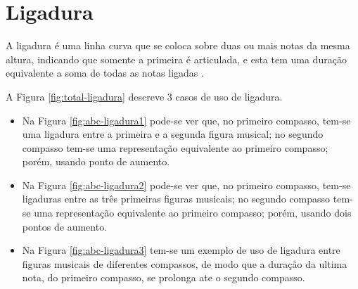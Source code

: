 
\section{Ligadura}
\label{sec:ligadura}

A ligadura é uma linha curva que se coloca sobre duas ou mais notas da mesma altura, 
indicando que somente a primeira é articulada, 
e esta tem uma duração equivalente a soma de todas as notas ligadas \cite[pp. 35]{cardoso1973curso}.

\begin{example}
A Figura \ref{fig:total-ligadura} descreve 3 casos de uso de ligadura.
\begin{itemize}
\item Na Figura \ref{fig:abc-ligadura1} pode-se ver que, no primeiro compasso, 
tem-se uma ligadura entre a primeira e a segunda figura musical; 
no segundo compasso tem-se uma representação equivalente ao primeiro compasso; 
porém, usando ponto de aumento.
\item Na Figura \ref{fig:abc-ligadura2} pode-se ver que, no primeiro compasso, 
tem-se ligaduras entre as três primeiras figuras musicais; 
no segundo compasso tem-se uma representação equivalente ao primeiro compasso; 
porém, usando dois pontos de aumento.
\item Na Figura \ref{fig:abc-ligadura3} tem-se um exemplo de uso de ligadura entre figuras musicais de diferentes compassos,
de modo que a duração da ultima nota, do primeiro compasso, se prolonga ate o segundo compasso.
\end{itemize}
\end{example}


